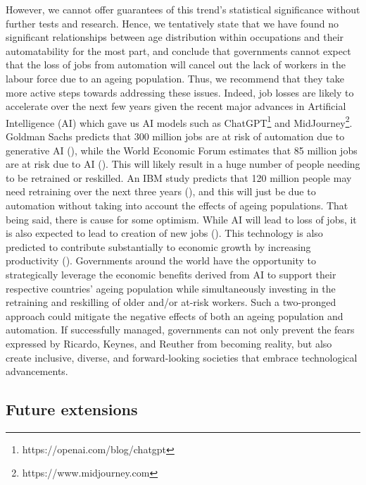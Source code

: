 \documentclass[11pt]{article}
\begin{document}
However, we cannot offer guarantees of this trend's statistical significance without further tests and research. Hence, we tentatively state that we have found no significant relationships between age distribution within occupations and their automatability for the most part, and conclude that governments cannot expect that the loss of jobs from automation will cancel out the lack of workers in the labour force due to an ageing population. Thus, we recommend that they take more active steps towards addressing these issues. Indeed, job losses are likely to accelerate over the next few years given the recent major advances in Artificial Intelligence (AI) which gave us AI models such as ChatGPT\footnote{https://openai.com/blog/chatgpt} and MidJourney\footnote{https://www.midjourney.com}. Goldman Sachs predicts that 300 million jobs are at risk of automation due to generative AI (\cite{hatzius2023potentially}), while the World Economic Forum estimates that 85 million jobs are at risk due to AI (\cite{world2020future}). This will likely result in a huge number of people needing to be retrained or reskilled. An IBM study predicts that 120 million people may need retraining over the next three years (\cite{laprade2019enterprise}), and this will just be due to automation without taking into account the effects of ageing populations. That being said, there is cause for some optimism. While AI will lead to loss of jobs, it is also expected to lead to creation of new jobs (\cite{hawksworth_berriman_goel,world2020future}). This technology is also predicted to contribute substantially to economic growth by increasing productivity (\cite{hatzius2023potentially,laprade2019enterprise,rao_verweij}). Governments around the world have the opportunity to strategically leverage the economic benefits derived from AI to support their respective countries' ageing population while simultaneously investing in the retraining and reskilling of older and/or at-risk workers. Such a two-pronged approach could mitigate the negative effects of both an ageing population and automation. If successfully managed, governments can not only prevent the fears expressed by Ricardo, Keynes, and Reuther from becoming reality, but also create inclusive, diverse, and forward-looking societies that embrace technological advancements.




\subsection*{Future extensions}
\end{document}
